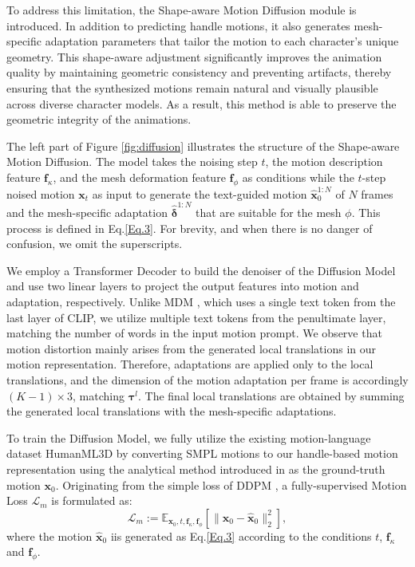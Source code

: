 \documentclass[lettersize,journal]{IEEEtran}
\newcommand{\blu}[1]{\texorpdfstring{{\leavevmode\color{blue}#1}}{#1}}
\begin{document}
To address this limitation, the Shape-aware Motion Diffusion module is introduced. In addition to predicting handle motions, it also generates mesh-specific adaptation parameters that tailor the motion to each character’s unique geometry. This shape-aware adjustment significantly improves the animation quality by maintaining geometric consistency and preventing artifacts, thereby ensuring that the synthesized motions remain natural and visually plausible across diverse character models. As a result, this method is able to preserve the geometric integrity of the animations.

The left part of Figure \ref{fig:diffusion} illustrates the structure of the Shape-aware Motion Diffusion. The model takes the noising step $t$, the motion description feature $\bm{f}_{\kappa}$, and the mesh deformation feature $\bm{f}_{\phi}$ as conditions while the $t$-step noised motion $\bm{x}_{t}$ as input to generate the text-guided motion $\hat{\bm{x}}_{0}^{1:N}$ of $N$ frames and the mesh-specific adaptation $\hat{\bm{\delta}}^{1:N}$ that are suitable for the mesh $\phi$. This process is defined in Eq.\blu{\ref{Eq.3}}. For brevity, and when there is no danger of confusion, we omit the superscripts.

We \blu{employ a} Transformer Decoder \cite{vaswani2017attention} to build the denoiser of the Diffusion Model and use two linear layers to project the output features into motion and adaptation, respectively. Unlike MDM \cite{tevet2022human}, which uses a single text token from the last layer of CLIP, we utilize multiple text tokens from the penultimate layer, matching the number of words in the input motion prompt. We observe that motion distortion mainly arises from the generated local translations in our motion representation. Therefore, adaptations are applied only to the local translations, and the dimension of the motion adaptation per frame is accordingly ${(K-1) \times 3}$, matching $\bm{\tau}^{l}$. The final local translations are obtained by summing the generated local translations with the mesh-specific adaptations.

To train the Diffusion Model, we fully utilize the existing motion-language dataset \blu{HumanML3D} \cite{guo2022generating} by converting SMPL motions to our handle-based motion representation using the analytical method introduced in \cite{besl1992method} as the ground-truth motion $\bm{x}_0$. Originating from the simple loss of DDPM \cite{ho2020denoising}, a fully-supervised Motion Loss $\mathcal{L}_m$ is formulated as:
\begin{equation} \label{Eq.9}
\mathcal{L}_{m} := \mathbb{E}_{\bm{x}_0, t, \bm{f}_{\kappa}, \bm{f}_{\phi}} \left[ \lVert \bm{x}_0 - \hat{\bm{x}}_{0} \rVert^{2}_{2} \right ],
\end{equation}
where the motion $\hat{\bm{x}}_{0}$ iis generated as Eq.\blu{\ref{Eq.3}} according to the conditions $t$, $\bm{f}_{\kappa}$ and $\bm{f}_{\phi}$.
\end{document}
